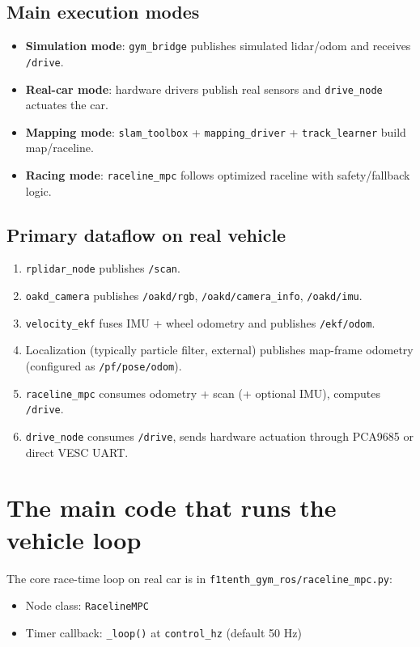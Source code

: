 \documentclass[11pt]{article}
\begin{document}
\subsection{Main execution modes}
\begin{itemize}
  \item \textbf{Simulation mode}: \texttt{gym\_bridge} publishes simulated lidar/odom and receives \texttt{/drive}.
  \item \textbf{Real-car mode}: hardware drivers publish real sensors and \texttt{drive\_node} actuates the car.
  \item \textbf{Mapping mode}: \texttt{slam\_toolbox} + \texttt{mapping\_driver} + \texttt{track\_learner} build map/raceline.
  \item \textbf{Racing mode}: \texttt{raceline\_mpc} follows optimized raceline with safety/fallback logic.
\end{itemize}

\subsection{Primary dataflow on real vehicle}
\begin{enumerate}
  \item \texttt{rplidar\_node} publishes \texttt{/scan}.
  \item \texttt{oakd\_camera} publishes \texttt{/oakd/rgb}, \texttt{/oakd/camera\_info}, \texttt{/oakd/imu}.
  \item \texttt{velocity\_ekf} fuses IMU + wheel odometry and publishes \texttt{/ekf/odom}.
  \item Localization (typically particle filter, external) publishes map-frame odometry (configured as \texttt{/pf/pose/odom}).
  \item \texttt{raceline\_mpc} consumes odometry + scan (+ optional IMU), computes \texttt{/drive}.
  \item \texttt{drive\_node} consumes \texttt{/drive}, sends hardware actuation through PCA9685 or direct VESC UART.
\end{enumerate}

\section{The main code that runs the vehicle loop}
The core race-time loop on real car is in \texttt{f1tenth\_gym\_ros/raceline\_mpc.py}:
\begin{itemize}
  \item Node class: \texttt{RacelineMPC}
  \item Timer callback: \texttt{\_loop()} at \texttt{control\_hz} (default 50 Hz)
\end{itemize}
\end{document}
